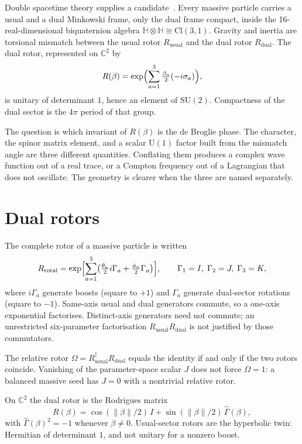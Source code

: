 \documentclass[a4paper]{article}
\begin{document}
Double spacetime theory supplies a candidate~\cite{dst-main}. Every massive particle carries a usual and a dual Minkowski frame, only the dual frame compact, inside the 16-real-dimensional biquaternion algebra \(\mathbb{H}\otimes\mathbb{H}\cong\mathrm{Cl}(3,1)\). Gravity and inertia are torsional mismatch between the usual rotor \(R_{\mathrm{usual}}\) and the dual rotor \(R_{\mathrm{dual}}\). The dual rotor, represented on \(\mathbb{C}^2\) by
\[
R(\beta)=\exp\Bigl(\sum_{a=1}^3\tfrac{\beta_a}{2}(-i\sigma_a)\Bigr),
\]
is unitary of determinant \(1\), hence an element of \(\mathrm{SU}(2)\). Compactness of the dual sector is the \(4\pi\) period of that group.

The question is which invariant of \(R(\beta)\) is the de Broglie phase. The character, the spinor matrix element, and a scalar \(\mathrm{U}(1)\) factor built from the mismatch angle are three different quantities. Conflating them produces a complex wave function out of a real trace, or a Compton frequency out of a Lagrangian that does not oscillate. The geometry is clearer when the three are named separately.

\section{Dual rotors}

The complete rotor of a massive particle is written
\[
R_{\mathrm{total}}
  =\exp\Bigl[\sum_{a=1}^3\bigl(\tfrac{\theta_a}{2}i\Gamma_a+\tfrac{\phi_a}{2}\Gamma_a\bigr)\Bigr],
\qquad \Gamma_1=I,\;\Gamma_2=J,\;\Gamma_3=K,
\]
where \(i\Gamma_a\) generate boosts (square to \(+1\)) and \(\Gamma_a\) generate dual-sector rotations (square to \(-1\)). Same-axis usual and dual generators commute, so a one-axis exponential factorises. Distinct-axis generators need not commute; an unrestricted six-parameter factorisation \(R_{\mathrm{usual}}R_{\mathrm{dual}}\) is not justified by those commutators.

The relative rotor \(\Omega=R_{\mathrm{usual}}^{\dagger}R_{\mathrm{dual}}\) equals the identity if and only if the two rotors coincide. Vanishing of the parameter-space scalar \(J\) does not force \(\Omega=1\): a balanced massive seed has \(J=0\) with a nontrivial relative rotor.

On \(\mathbb{C}^2\) the dual rotor is the Rodrigues matrix
\[
R(\beta)=\cos(\lVert\beta\rVert/2)\,I+\sin(\lVert\beta\rVert/2)\,\widehat{\Gamma}(\beta),
\]
with \(\widehat{\Gamma}(\beta)^2=-1\) whenever \(\beta\neq 0\). Usual-sector rotors are the hyperbolic twin: Hermitian of determinant \(1\), and not unitary for a nonzero boost.
\end{document}
